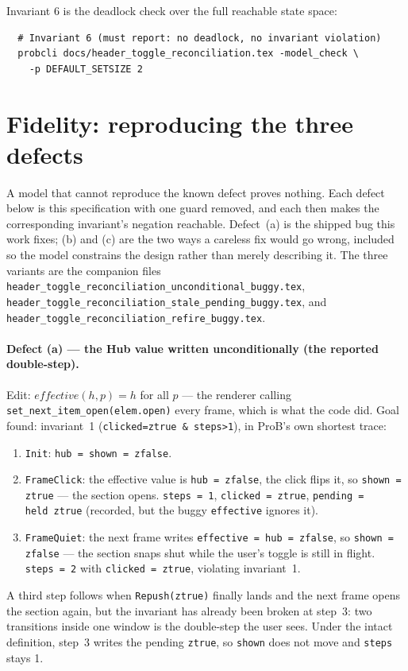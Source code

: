 \documentclass[a4paper,10pt,fleqn]{article}
\begin{document}
Invariant 6 is the deadlock check over the full reachable state space:
\begin{verbatim}
  # Invariant 6 (must report: no deadlock, no invariant violation)
  probcli docs/header_toggle_reconciliation.tex -model_check \
    -p DEFAULT_SETSIZE 2
\end{verbatim}

\section{Fidelity: reproducing the three defects}
\label{sec:fidelity}

A model that cannot reproduce the known defect proves nothing.  Each defect
below is this specification with one guard removed, and each then makes the
corresponding invariant's negation reachable.  Defect~(a) is the shipped bug
this work fixes; (b) and (c) are the two ways a careless fix would go wrong,
included so the model constrains the design rather than merely describing it.
The three variants are the companion files
\texttt{header\_toggle\_reconciliation\_unconditional\_buggy.tex},
\texttt{header\_toggle\_reconciliation\_stale\_pending\_buggy.tex}, and
\texttt{header\_toggle\_reconciliation\_refire\_buggy.tex}.

\paragraph{Defect (a) --- the Hub value written unconditionally (the reported
double-step).}
Edit: $effective(h, p) = h$ for all $p$ --- the renderer calling
\texttt{set\_next\_item\_open(elem.open)} every frame, which is what the code
did.  Goal found: invariant~1 (\texttt{clicked=ztrue \& steps>1}), in ProB's
own shortest trace:
\begin{enumerate}
  \item \texttt{Init}: \texttt{hub = shown = zfalse}.
  \item \texttt{FrameClick}: the effective value is \texttt{hub = zfalse}, the
    click flips it, so \texttt{shown = ztrue} --- the section opens.
    \texttt{steps = 1}, \texttt{clicked = ztrue}, \texttt{pending = held~ztrue}
    (recorded, but the buggy \texttt{effective} ignores it).
  \item \texttt{FrameQuiet}: the next frame writes \texttt{effective = hub =
    zfalse}, so \texttt{shown = zfalse} --- the section snaps shut while the
    user's toggle is still in flight.  \texttt{steps = 2} with
    \texttt{clicked = ztrue}, violating invariant~1.
\end{enumerate}
A third step follows when \texttt{Repush(ztrue)} finally lands and the next
frame opens the section again, but the invariant has already been broken at
step~3: two transitions inside one window is the double-step the user sees.
Under the intact definition, step~3 writes the pending \texttt{ztrue}, so
\texttt{shown} does not move and \texttt{steps} stays 1.
\end{document}
